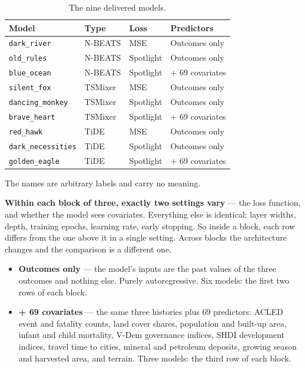 \begin{table}[h!]
\centering
\renewcommand{\arraystretch}{1.2}
\caption{The nine delivered models.}
\label{tab:models}
\begin{tabular}{@{}p{3.6cm}p{2.2cm}p{2.4cm}p{5.2cm}@{}}
\toprule
\textbf{Model} & \textbf{Type} & \textbf{Loss} & \textbf{Predictors} \\ \midrule
\texttt{dark\_river}       & N-BEATS & MSE       & Outcomes only \\
\texttt{old\_rules}        & N-BEATS & Spotlight & Outcomes only \\
\texttt{blue\_ocean}       & N-BEATS & Spotlight & + 69 covariates \\ \addlinespace
\texttt{silent\_fox}       & TSMixer & MSE       & Outcomes only \\
\texttt{dancing\_monkey}   & TSMixer & Spotlight & Outcomes only \\
\texttt{brave\_heart}      & TSMixer & Spotlight & + 69 covariates \\ \addlinespace
\texttt{red\_hawk}         & TiDE    & MSE       & Outcomes only \\
\texttt{dark\_necessities} & TiDE    & Spotlight & Outcomes only \\
\texttt{golden\_eagle}     & TiDE    & Spotlight & + 69 covariates \\
\bottomrule
\end{tabular}
\end{table}

The names are arbitrary labels and carry no meaning.

\textbf{Within each block of three, exactly two settings vary} --- the loss function, and whether
the model sees covariates. Everything else is identical: layer widths, depth, training epochs,
learning rate, early stopping. So inside a block, each row differs from the one above it in a
single setting. Across blocks the architecture changes and the comparison is a different one.

\begin{itemize}
    \item \textbf{Outcomes only} --- the model's inputs are the past values of the three outcomes
          and nothing else. Purely autoregressive. Six models: the first two rows of each block.
    \item \textbf{+ 69 covariates} --- the same three histories plus 69 predictors: ACLED event and
          fatality counts, land cover shares, population and built-up area, infant and child
          mortality, V-Dem governance indices, SHDI development indices, travel time to cities,
          mineral and petroleum deposits, growing season and harvested area, and terrain. Three
          models: the third row of each block.
\end{itemize}

